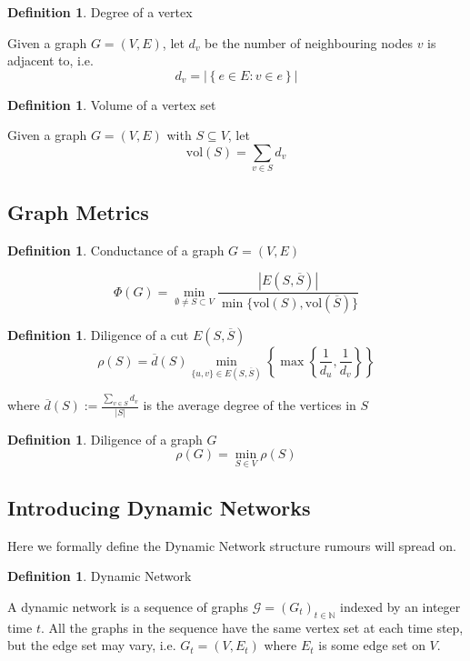 \documentclass[a4paper,11pt]{article}
\theoremstyle{definition}
\newtheorem{definition}[theorem]{Definition}
\newcommand*\comp[1]{\overline{#1}}
\begin{document}
\begin{definition}
	Degree of a vertex

	\noindent
	Given a graph $G = (V, E)$, let $d_v$ be the number of neighbouring nodes $v$ is adjacent to, i.e. $$
		d_v = |\left\{ e \in E : v \in e \right\}|
	$$
\end{definition}

\begin{definition}
	Volume of a vertex set

	\noindent
	Given a graph $G = (V, E)$ with $S \subseteq V$, let 
	$$
		\text{vol}(S) = \sum_{v \in S} d_v
	$$
\end{definition}


\subsection{Graph Metrics}

\begin{definition}
	Conductance of a graph $G = (V, E)$

	$$
		\Phi(G) = \min_{\emptyset \neq S \subset V} \frac{|E(S, \comp{S})|}{\min\{\text{vol}(S), \text{vol}(\comp{S})\}}
	$$
\end{definition}

\begin{definition}
	Diligence of a cut $ E(S, \comp{S}) $
	$$
		\rho(S) = \comp{d}(S) \min_{\{u, v\} \in E(S, \comp{S}) } \left\{ \max \left\{ \frac{1}{d_u},\frac{1}{d_v} \right\} \right\}
	$$ 

	where $\comp{d}(S) := \frac{\sum_{v \in S} d_v}{|S|}$ is the average degree of the vertices in $S$
\end{definition}

\begin{definition}
	Diligence of a graph $G$
	$$
		\rho(G) = \min_{S \in V} \rho(S) 
	$$
\end{definition}

\subsection{Introducing Dynamic Networks}

Here we formally define the Dynamic Network structure rumours will spread on.

\begin{definition}
	Dynamic Network

	\noindent
	A dynamic network is a sequence of graphs $\mathcal{G} = (G_t)_{t \in \mathbb{N}}$ indexed by an integer time $t$. All the graphs in the sequence have the same vertex set at each time step, but the edge set may vary, i.e.  $G_t = (V, E_t)$ where $E_t$ is some edge set on $V$.
\end{definition}
\end{document}
